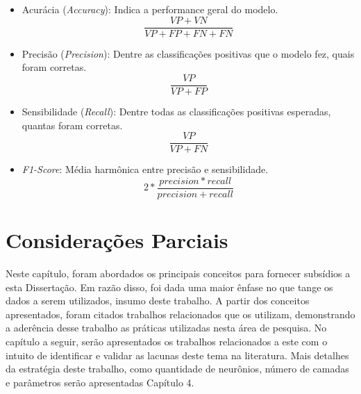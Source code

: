 \begin{itemize}
    \item Acurácia (\textit{Accuracy}): Indica a performance geral do modelo.
        \begin{equation}
        \frac{VP + VN}{VP+FP+FN+FN}
        \end{equation}
    \item Precisão (\textit{Precision}): Dentre as classificações positivas que o modelo fez, quais foram corretas.
        \begin{equation}
        \frac{VP}{VP+FP}
        \end{equation}
    \item Sensibilidade (\textit{Recall}): Dentre todas as classificações positivas esperadas, quantas foram corretas.
        \begin{equation}
        \frac{VP}{VP+FN}
        \end{equation}
    \item \textit{F1-Score}: Média harmônica entre precisão e sensibilidade.
        \begin{equation}
        2 * \frac{precision  * recall}{precision + recall}
        \end{equation}
\end{itemize}

\section{Considerações Parciais}

Neste capítulo, foram abordados os principais conceitos para fornecer subsídios a esta Dissertação. Em razão disso, foi dada uma maior ênfase no que tange os dados a serem utilizados, insumo deste trabalho. A partir dos conceitos apresentados, foram citados trabalhos relacionados que os utilizam, demonstrando a aderência desse trabalho as práticas utilizadas nesta área de pesquisa. No capítulo a seguir, serão apresentados os trabalhos relacionados a este com o intuito de identificar e validar as lacunas deste tema na literatura. Mais detalhes da estratégia deste trabalho, como quantidade de neurônios, número de camadas e parâmetros serão apresentadas Capítulo 4.
